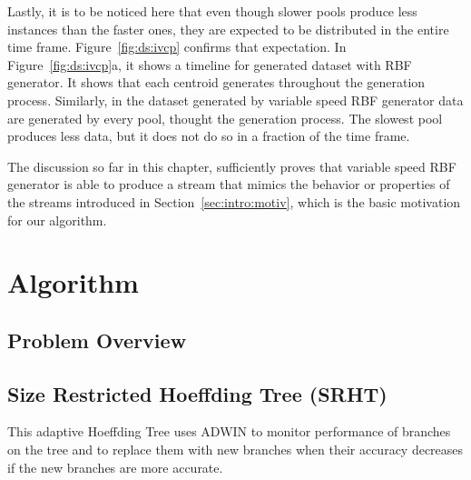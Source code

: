 \documentclass[a4paper, 11pt, oneside]{book}
\begin{document}
Lastly, it is to be noticed here that even though slower pools produce less instances than the faster ones, they are expected to be distributed in the entire time frame. Figure~\ref{fig:ds:ivcp} confirms that expectation. In Figure~\ref{fig:ds:ivcp}a, it shows a timeline for generated dataset with RBF generator. It shows that each centroid generates throughout the generation process. Similarly, in the dataset generated by variable speed RBF generator data are generated by every pool, thought the generation process. The slowest pool produces less data, but it does not do so in a fraction of the time frame.

The discussion so far in this chapter, sufficiently proves that variable speed RBF generator is able to produce a stream that mimics the behavior or properties of the streams introduced in Section~\ref{sec:intro:motiv}, which is the basic motivation for our algorithm.

\chapter{Algorithm}


\section{Problem Overview}

\section{Size Restricted Hoeffding Tree (SRHT)}
This adaptive Hoeffding Tree uses ADWIN to monitor performance of branches on the tree and to replace them with new branches when their accuracy decreases if the new branches are more accurate.
\end{document}
